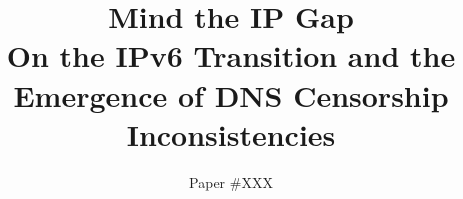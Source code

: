 \documentclass[letterpaper,twocolumn,10pt]{article}
\begin{document}
\pagestyle{plain} %


\renewcommand{\sectionautorefname}{\S}
\renewcommand{\subsectionautorefname}{\S}
\renewcommand{\subsubsectionautorefname}{\S}
\date{}

\setlength{\droptitle}{-5em}   %
\posttitle{\par\end{center}}   %
\title{{\bf Mind the IP Gap}\\\Large{On the IPv6 Transition and the Emergence of
DNS Censorship Inconsistencies}}
\author{Paper \#XXX}


\maketitle

\begin{abstract}
 
\end{abstract}





















\end{document}
